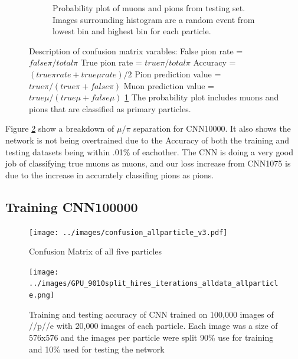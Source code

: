 \begin{figure}[htp!]
\begin{subfigure}[b]{\textwidth}
	\caption{Probability plot of muons and pions from testing set. Images surrounding histogram are a random event from lowest bin and highest bin for each particle.}
	\label{fig:prob_plot}
	\end{subfigure}
\caption{Description of confusion matrix varables: False pion rate = $false \pi/ total \pi$ True pion rate = $true \pi/total \pi$ Accuracy = $(true \pi rate + true \mu rate)/2$ Pion prediction value = $true \pi/(true \pi + false \pi)$ Muon prediction value = $true \mu/(true \mu + false \mu)$ \ref{fig:prob_plot} The probability plot includes muons and pions that are classified as primary particles.}
\label{fig:CNN_train}
\end{figure}

Figure \ref{fig:CNN_train} show a breakdown of $\mu/\pi$ separation for CNN10000. It also shows the network is not being overtrained due to the Accuracy of both the training and testing datasets being within .01\% of eachother. The CNN is doing a very good job of classifying true muons as muons, and our loss increase from CNN1075 is due to the increase in accurately classifing pions as pions. 



\subsection{Training CNN100000}

\begin{figure}[htp]
\centering
\texttt{[image: ../images/confusion\_allparticle\_v3.pdf]}
\caption{Confusion Matrix of all five particles }
\label{fig:confusion100000}
\end{figure}

\begin{figure}[htp]
\centering
\texttt{[image: ../images/GPU\_9010split\_hires\_iterations\_alldata\_allparticle.png]}
\caption{Training and testing accuracy of CNN trained on 100,000 images of \mu/\pi/p/\gamma/e with 20,000 images of each particle. Each image was a size of 576x576 and the images per particle were split 90\% use for training and 10\% used for testing the network}
\label{fig:gpuacc}
\end{figure}

